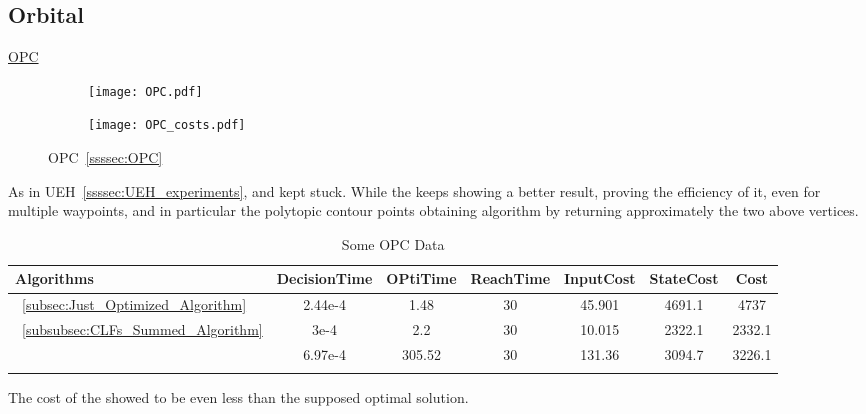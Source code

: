  \newpage

\subsection{Orbital}
\label{subsec:orbital_experiments}

\underline{OPC}
\label{OPC_experiments} %

 \begin{figure}[htbp]
  \begin{subfigure}{0.5\textwidth}
    \centering
    \texttt{[image: OPC.pdf]}
  \label{fig:OPC_CostEvol}
  \end{subfigure}
  \begin{subfigure}{0.6\textwidth}
    \centering
    \texttt{[image: OPC\_costs.pdf]}
  \label{fig:OPC_trajectory}
  \end{subfigure}
  \caption{OPC~\ref{ssssec:OPC}}
\label{fig:OPCTrajectory_and_CostEvol}
\end{figure}


As in UEH~\ref{ssssec:UEH_experiments},  and   kept stuck. While the  keeps showing a better result, proving the efficiency of it, even for multiple waypoints, and in particular the polytopic contour points obtaining algorithm by returning approximately the two above vertices. 


  \bgroup
 \begin{xltabular}{\textwidth}{|l|cccccc|}
   \toprule
   Algorithms   & DecisionTime & OPtiTime & ReachTime  & InputCost   & StateCost & Cost           \\
   \midrule
    ~\ref{subsec:Just_Optimized_Algorithm}           & 2.44e-4 & 1.48 & 30 & 45.901  & 4691.1  & 4737 \\
    ~\ref{subsubsec:CLFs_Summed_Algorithm}        & 3e-4 & 2.2     & 30 & 10.015 & 2322.1 &  2332.1 \\
                          & 6.97e-4  & 305.52     & 30  & 131.36 & 3094.7 & 3226.1 \\
    \midrule
    \caption{Some OPC Data}
    \label{tab:Some_OPC_Data}\\
   \end{xltabular}
 \egroup


The cost of the  showed to be even less than the supposed optimal solution.


